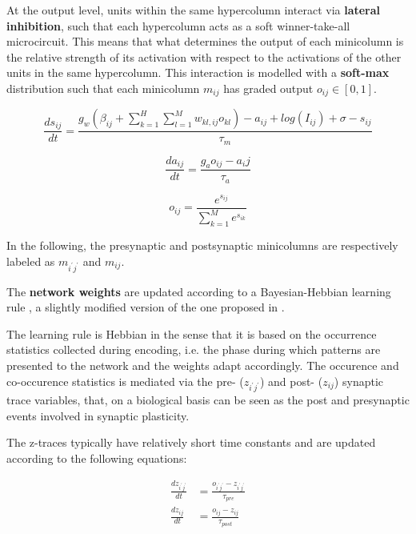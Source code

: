 At the output level, units within the same hypercolumn interact via \textbf{lateral inhibition}, such that each hypercolumn acts as a soft winner-take-all microcircuit. This means that what determines the output of each minicolumn is the relative strength of its activation with respect to the activations of the other units in the same hypercolumn. This interaction is modelled with a \textbf{soft-max} distribution such that each minicolumn $m_{ij}$ has graded output $o_{ij}\in[0,1]$.

\begin{equation}
    \frac{ds_{ij}}{dt} = \frac{g_w(\beta_{ij}+\sum\limits_{k=1}^H\sum\limits_{l=1}^M w_{kl,ij}o_{kl})-a_{ij}+log(I_{ij})+\sigma-s_{ij}}{\tau_m} 
    \label{eq:sij}
\end{equation}

\begin{equation}
    \frac{da_{ij}}{dt} = \frac{g_ao_{ij}-a_ij}{\tau_a} 
    \label{eq:aij}
\end{equation}

\begin{equation}
    o_{ij} = \frac{e^{s_{ij}}}{ \sum\limits_{k=1}^M e^{s_{ik}}}
    \label{eq:oij}
\end{equation}

In the following, the presynaptic and postsynaptic minicolumns are respectively labeled as $m_{i^{\prime}j^{\prime}}$ and $m_{ij}$.  

The \textbf{network weights} are updated according to a Bayesian-Hebbian learning rule \cite{LansnerFRC}, a slightly modified version of the one proposed in \cite{SANDBERG2000987}.

The learning rule is Hebbian in the sense that it is based on the occurrence statistics collected during encoding, i.e. the phase during which patterns are presented to the network and the weights adapt accordingly.
The occurence and co-occurence statistics is mediated via the  pre- ($z_{i^{\prime}j^{\prime}}$) and post- ($z_{ij}$) synaptic trace variables, that, on a biological basis can be seen as the post and presynaptic events involved in synaptic plasticity. 

The z-traces typically have relatively short time constants and are updated according to the following equations:

\begin{equation}
\begin{aligned}
     \frac{dz_{i^{\prime}j^{\prime}}}{dt} & = \frac{o_{i^{\prime}j^{\prime}}-z_{i^{\prime}j^{\prime}}}{\tau_{pre}} \\
      \frac{dz_{ij}}{dt} & = \frac{o_{ij}-z_{ij}}{\tau_{post}} 
     \end{aligned}
    \label{eq:zij}
\end{equation}

